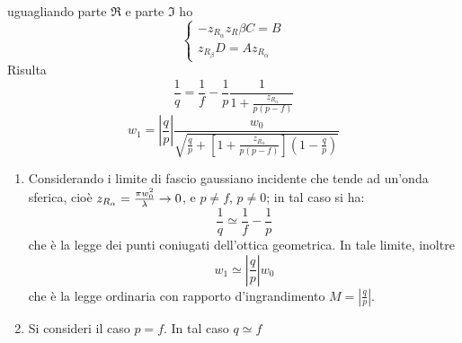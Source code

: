 uguagliando parte $\Re$ e parte $\Im$ ho
\begin{equation*}
\begin{cases}
-z_{R_\alpha} z_R{\beta} C = B\\
z_{R_\beta} D = A z_{R_\alpha}
\end{cases}
\end{equation*}
Risulta
\begin{equation*}
\frac{1}{q} = \frac{1}{f} - \frac{1}{p} \frac{1}{1 + \frac{z_{R_\alpha}}{p(p-f)}}
\end{equation*}
\begin{equation*}
w_1 = \left|\frac{q}{p}\right| \frac{w_0}{\sqrt{\frac{q}{p} + \left[ 1 + \frac{z_{R_\alpha}}{p(p-f)}\right] \left(	1 - \frac{q}{p}\right)}}
\end{equation*}
\begin{enumerate}
\item Considerando i limite di fascio gaussiano incidente che tende ad un'onda sferica, cioè $z_{R_\alpha} = \frac{\pi w_0^2}{\lambda} \rightarrow 0$, e $p \neq f$, $p \neq 0$; in tal caso si ha:
\begin{equation*}
\frac{1}{q} \simeq \frac{1}{f} - \frac{1}{p}
\end{equation*}
che è la legge dei punti coniugati dell'ottica geometrica. In tale limite, inoltre
\begin{equation*}
w_1 \simeq \left|\frac{q}{p}\right| w_0
\end{equation*}
che è la legge ordinaria con rapporto d'ingrandimento $M= \left| \frac{q}{p}\right|$.
\item Si consideri il caso $p = f$. In tal caso $q \simeq f$
\end{enumerate}


